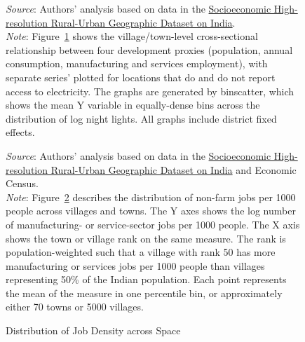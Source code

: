 \documentclass[12pt,letterpaper]{article}
\newcommand{\shrugpath}{.}
\begin{document}
\begin{appendix}
\begin{figure}[H]
  \begin{adjustwidth}{2cm}{2cm}
    \footnotesize{\textit{Source}: Authors' analysis based on data in
      the \href{http://www.devdatalab.org/shrug}{Socioeconomic
        High-resolution Rural-Urban Geographic Dataset on
        India}. \\ \textit{Note}: Figure~\ref{fig:nl_xvars_pow} shows the
      village/town-level cross-sectional relationship between four
      development proxies (population, annual consumption, manufacturing and
      services employment), with separate series' plotted for
      locations that do and do not report access to electricity. The
      graphs are generated by binscatter, which shows the mean Y
      variable in equally-dense bins across the distribution of log
      night lights. All graphs include district fixed effects.}
  \end{adjustwidth}
  
\label{fig:nl_xvars_pow}
\end{figure}

\newpage
\begin{figure}[H]\caption{Distribution of Job Density across Space}
  \begin{center}
  \end{center}

\begin{adjustwidth}{2cm}{2cm}
  \footnotesize{\textit{Source}: Authors' analysis based on data in the
  \href{http://www.devdatalab.org/shrug}{Socioeconomic High-resolution
    Rural-Urban Geographic Dataset on India} and Economic Census. \\ \textit{Note}: Figure~\ref{fig:job_dist} describes the distribution
    of non-farm jobs per 1000 people across villages and towns. The Y
    axes shows the log number of manufacturing- or service-sector jobs
    per 1000 people. The X axis shows the town or village rank on the
    same measure. The rank is population-weighted such that a village
    with rank 50 has more manufacturing or services jobs per 1000
    people than villages representing 50\% of the Indian
    population. Each point represents the mean of the measure in one
    percentile bin, or approximately either 70 towns or 5000
    villages.}

\end{adjustwidth}

\label{fig:job_dist}
\end{figure}


\end{appendix}
\end{document}
